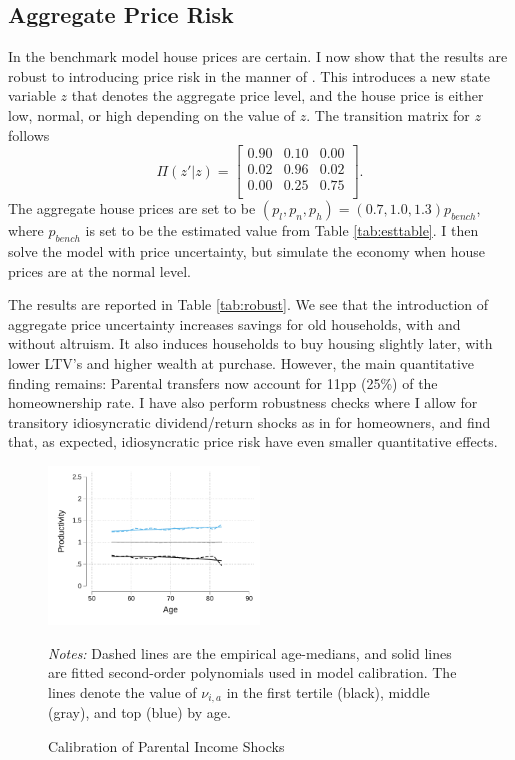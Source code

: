 \documentclass[12pt]{article}
\begin{document}
\subsection{Aggregate Price Risk}\label{sec:robust_pricerisk}
In the benchmark model house prices are certain. I now show that the results are robust to introducing price risk in the manner of \cite{Corbae2015}. This introduces a new state variable $z$ that denotes the aggregate price level, and the house price is either low, normal, or high depending on the value of $z$. The transition matrix for $z$ follows 
\begin{equation}
\Pi(z'|z) = \begin{bmatrix}
0.90 & 0.10 & 0.00 \\
0.02 & 0.96 & 0.02 \\
0.00 & 0.25 & 0.75 \\
\end{bmatrix}.
\end{equation}
The aggregate house prices are set to be $(p_l,p_n,p_h)=(0.7,1.0,1.3)p_{bench}$, where $p_{bench}$ is set to be the estimated value from Table \ref{tab:esttable}. I then solve the model with price uncertainty, but simulate the economy when house prices are at the normal level. 

The results are reported in Table \ref{tab:robust}. We see that the introduction of aggregate price uncertainty increases savings for old households, with and without altruism. It also induces households to buy housing slightly later, with lower LTV's and higher wealth at purchase. However, the main quantitative finding remains: Parental transfers now account for 11pp (25\%) of the homeownership rate. I have also perform robustness checks where I allow for transitory idiosyncratic dividend/return shocks as in \cite{Chang2024} for homeowners, and find that, as expected, idiosyncratic price risk have even smaller quantitative effects.



\begin{figure}
    \caption{Calibration of Parental Income Shocks}\label{fig:nu}
	{\centering
    \includegraphics[width=0.5\textwidth]{../tabfig/empirical/lifecycleproductivity_old_3}
    \par}    {\begin{footnotesize} \textit{Notes:}
        Dashed lines are the empirical age-medians, and solid lines are fitted second-order polynomials used in model calibration. The lines denote the value of $\nu_{i,a}$ in the first tertile (black), middle (gray), and top (blue) by age.
    \end{footnotesize}}
\end{figure}
\end{document}

